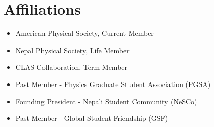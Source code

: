 \documentclass[10pt, letterpaper]{article}
\newcommand{\years}[1]{\marginnote{\small #1}} %
\begin{document}
\section*{Affiliations}
\noindent
\begin{itemize}
  \item American Physical Society, Current Member 
  \item Nepal Physical Society, Life Member %
  \item CLAS Collaboration, Term Member %
  \item Past Member - Physics Graduate Student Association (PGSA)
  \item Founding President - Nepali Student Community (NeSCo)
  \item Past Member - Global Student Friendship (GSF)
\end{itemize}





\end{document}

